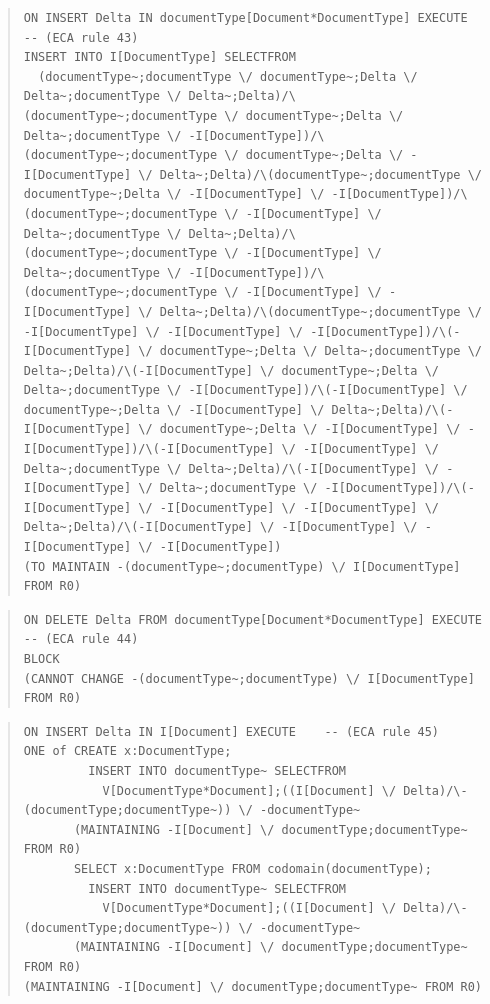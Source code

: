 \documentclass[10pt,a4paper]{report}              %
\theoremstyle{plain}\theorembodyfont{\rmfamily}\newtheorem{definition}{Definition}[section]
\theoremstyle{plain}\theorembodyfont{\rmfamily}\newtheorem{designrule}[definition]{Requirement}
\begin{document}
\begin{quote}
\begin{verbatim}
ON INSERT Delta IN documentType[Document*DocumentType] EXECUTE    -- (ECA rule 43)
INSERT INTO I[DocumentType] SELECTFROM
  (documentType~;documentType \/ documentType~;Delta \/ Delta~;documentType \/ Delta~;Delta)/\(documentType~;documentType \/ documentType~;Delta \/ Delta~;documentType \/ -I[DocumentType])/\(documentType~;documentType \/ documentType~;Delta \/ -I[DocumentType] \/ Delta~;Delta)/\(documentType~;documentType \/ documentType~;Delta \/ -I[DocumentType] \/ -I[DocumentType])/\(documentType~;documentType \/ -I[DocumentType] \/ Delta~;documentType \/ Delta~;Delta)/\(documentType~;documentType \/ -I[DocumentType] \/ Delta~;documentType \/ -I[DocumentType])/\(documentType~;documentType \/ -I[DocumentType] \/ -I[DocumentType] \/ Delta~;Delta)/\(documentType~;documentType \/ -I[DocumentType] \/ -I[DocumentType] \/ -I[DocumentType])/\(-I[DocumentType] \/ documentType~;Delta \/ Delta~;documentType \/ Delta~;Delta)/\(-I[DocumentType] \/ documentType~;Delta \/ Delta~;documentType \/ -I[DocumentType])/\(-I[DocumentType] \/ documentType~;Delta \/ -I[DocumentType] \/ Delta~;Delta)/\(-I[DocumentType] \/ documentType~;Delta \/ -I[DocumentType] \/ -I[DocumentType])/\(-I[DocumentType] \/ -I[DocumentType] \/ Delta~;documentType \/ Delta~;Delta)/\(-I[DocumentType] \/ -I[DocumentType] \/ Delta~;documentType \/ -I[DocumentType])/\(-I[DocumentType] \/ -I[DocumentType] \/ -I[DocumentType] \/ Delta~;Delta)/\(-I[DocumentType] \/ -I[DocumentType] \/ -I[DocumentType] \/ -I[DocumentType])
(TO MAINTAIN -(documentType~;documentType) \/ I[DocumentType] FROM R0)
\end{verbatim}
\end{quote}
\begin{quote}
\begin{verbatim}
ON DELETE Delta FROM documentType[Document*DocumentType] EXECUTE    -- (ECA rule 44)
BLOCK
(CANNOT CHANGE -(documentType~;documentType) \/ I[DocumentType] FROM R0)
\end{verbatim}
\end{quote}
\begin{quote}
\begin{verbatim}
ON INSERT Delta IN I[Document] EXECUTE    -- (ECA rule 45)
ONE of CREATE x:DocumentType;
         INSERT INTO documentType~ SELECTFROM
           V[DocumentType*Document];((I[Document] \/ Delta)/\-(documentType;documentType~)) \/ -documentType~
       (MAINTAINING -I[Document] \/ documentType;documentType~ FROM R0)
       SELECT x:DocumentType FROM codomain(documentType);
         INSERT INTO documentType~ SELECTFROM
           V[DocumentType*Document];((I[Document] \/ Delta)/\-(documentType;documentType~)) \/ -documentType~
       (MAINTAINING -I[Document] \/ documentType;documentType~ FROM R0)
(MAINTAINING -I[Document] \/ documentType;documentType~ FROM R0)
\end{verbatim}
\end{quote}
\end{document}
